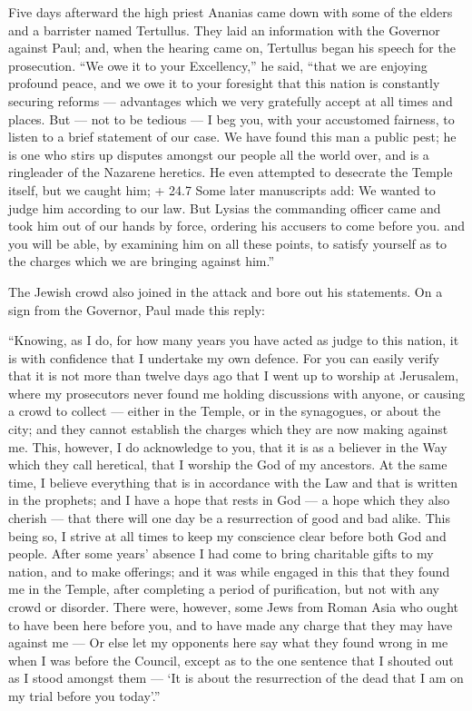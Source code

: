 Five days afterward the high priest Ananias came down with
some of the elders and a barrister named Tertullus. They laid an
information with the Governor against Paul;  and, when the
hearing came on, Tertullus began his speech for the prosecution.
 ``We owe it to your Excellency,'' he said, ``that we are
enjoying profound peace, and we owe it to your foresight that this
nation is constantly securing reforms --- advantages which we very
gratefully accept at all times and places.  But --- not to
be tedious --- I beg you, with your accustomed fairness, to listen to a
brief statement of our case.  We have found this man a
public pest; he is one who stirs up disputes amongst our people all the
world over, and is a ringleader of the Nazarene heretics. 
He even attempted to desecrate the Temple itself, but we caught him;
 + 24.7 Some later manuscripts add: We wanted to judge him
according to our law. But Lysias the commanding officer came and took
him out of our hands by force, ordering his accusers to come before you.
 and you will be able, by examining him on all these points,
to satisfy yourself as to the charges which we are bringing against
him.''

 The Jewish crowd also joined in the attack and bore out his
statements.  On a sign from the Governor, Paul made this
reply:

``Knowing, as I do, for how many years you have acted as judge to this
nation, it is with confidence that I undertake my own defence.
 For you can easily verify that it is not more than twelve
days ago that I went up to worship at Jerusalem,  where my
prosecutors never found me holding discussions with anyone, or causing a
crowd to collect --- either in the Temple, or in the synagogues, or
about the city;  and they cannot establish the charges
which they are now making against me.  This, however, I do
acknowledge to you, that it is as a believer in the Way which they call
heretical, that I worship the God of my ancestors. At the same time, I
believe everything that is in accordance with the Law and that is
written in the prophets;  and I have a hope that rests in
God --- a hope which they also cherish --- that there will one day be a
resurrection of good and bad alike.  This being so, I
strive at all times to keep my conscience clear before both God and
people.  After some years' absence I had come to bring
charitable gifts to my nation, and to make offerings;  and
it was while engaged in this that they found me in the Temple, after
completing a period of purification, but not with any crowd or disorder.
 There were, however, some Jews from Roman Asia who ought
to have been here before you, and to have made any charge that they may
have against me ---  Or else let my opponents here say what
they found wrong in me when I was before the Council, 
except as to the one sentence that I shouted out as I stood amongst them
--- `It is about the resurrection of the dead that I am on my trial
before you today'.''

